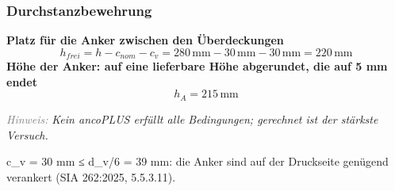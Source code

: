 \documentclass[11pt,a4paper]{article}
\newcommand{\hinweis}[2]{\par\noindent\textcolor{gray}{\textit{#1:}} \textit{#2}\par}
\begin{document}
\subsubsection{Durchstanzbewehrung}
\noindent\textbf{Platz für die Anker zwischen den Überdeckungen}
\begin{equation*}
h_{frei} = h - c_{nom} - c_v = 280\,\mathrm{mm} - 30\,\mathrm{mm} - 30\,\mathrm{mm} = 220\,\mathrm{mm}
\end{equation*}
\noindent\textbf{Höhe der Anker: auf eine lieferbare Höhe abgerundet, die auf 5 mm endet}
\begin{equation*}
h_A = 215\,\mathrm{mm}
\end{equation*}
\hinweis{Hinweis}{Kein ancoPLUS erfüllt alle Bedingungen; gerechnet ist der stärkste Versuch.}
c\_v = 30 mm ≤ d\_v/6 = 39 mm: die Anker sind auf der Druckseite genügend verankert (SIA 262:2025, 5.5.3.11).
\end{document}
